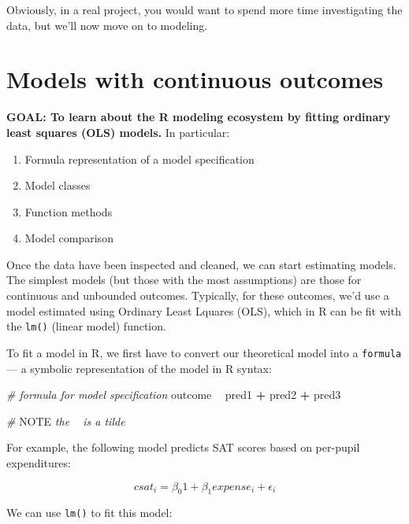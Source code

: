 \documentclass[]{book}
\newenvironment{Shaded}{\begin{snugshade}}{\end{snugshade}}
\newcommand{\AlertTok}[1]{\textcolor[rgb]{0.94,0.16,0.16}{#1}}
\newcommand{\CommentTok}[1]{\textcolor[rgb]{0.56,0.35,0.01}{\textit{#1}}}
\newcommand{\NormalTok}[1]{#1}
\newcommand{\OperatorTok}[1]{\textcolor[rgb]{0.81,0.36,0.00}{\textbf{#1}}}
\newcommand{\StringTok}[1]{\textcolor[rgb]{0.31,0.60,0.02}{#1}}
\providecommand{\tightlist}{%
  \setlength{\itemsep}{0pt}\setlength{\parskip}{0pt}}
\begin{document}
Obviously, in a real project, you would want to spend more time investigating the data,
but we'll now move on to modeling.

\hypertarget{models-with-continuous-outcomes}{%
\section{Models with continuous outcomes}\label{models-with-continuous-outcomes}}

\textbf{GOAL: To learn about the R modeling ecosystem by fitting ordinary least squares (OLS) models.} In particular:

\begin{enumerate}
\def\labelenumi{\arabic{enumi}.}
\tightlist
\item
  Formula representation of a model specification
\item
  Model classes
\item
  Function methods
\item
  Model comparison
\end{enumerate}

Once the data have been inspected and cleaned, we can start estimating models.
The simplest models (but those with the most assumptions) are those for continuous and unbounded outcomes.
Typically, for these outcomes, we'd use a model estimated using Ordinary Least Lquares (OLS),
which in R can be fit with the \texttt{lm()} (linear model) function.

To fit a model in R, we first have to convert our theoretical model into
a \texttt{formula} --- a symbolic representation of the model in R syntax:

\begin{Shaded}
\begin{Highlighting}[]
\CommentTok{# formula for model specification}
\NormalTok{outcome }\OperatorTok{~}\StringTok{ }\NormalTok{pred1 }\OperatorTok{+}\StringTok{ }\NormalTok{pred2 }\OperatorTok{+}\StringTok{ }\NormalTok{pred3}

\CommentTok{# }\AlertTok{NOTE}\CommentTok{ the ~ is a tilde}
\end{Highlighting}
\end{Shaded}

For example, the following model predicts SAT scores based on per-pupil expenditures:

\[
csat_i = \beta_{0}1 + \beta_1expense_i + \epsilon_i
\]

We can use \texttt{lm()} to fit this model:
\end{document}
